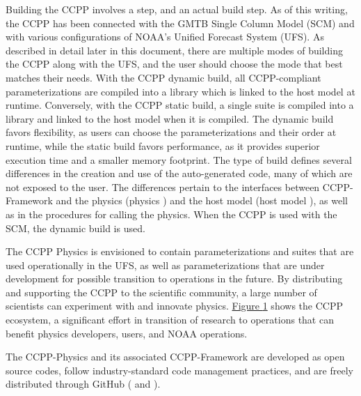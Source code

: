 \documentclass[letterpaper,10pt,english]{sphinxmanual}
\begin{document}
Building the CCPP involves a  step, and an actual build step. As of this
writing, the CCPP has been connected with the GMTB Single Column Model (SCM)
and with various configurations of NOAA’s Unified
Forecast System (UFS). As described in detail later in this document, there are
multiple modes of building the CCPP along with the UFS, and the user should choose the
mode that best matches their needs. With the CCPP dynamic build, all CCPP-compliant
parameterizations are compiled into a library which is linked to the host model at
runtime. Conversely, with the CCPP static build, a single suite is compiled into a
library and linked to the host model when it is compiled. The dynamic build favors
flexibility, as users can choose the parameterizations and their order at runtime,
while the static build favors performance, as it provides superior execution time and
a smaller memory footprint. The type of build defines several differences in the
creation and use of the auto-generated code, many of which are not exposed to the user.
The differences pertain to  the interfaces between CCPP-Framework and the physics
(physics ) and the host model (host model ), as well as in the procedures
for calling the physics. When the CCPP is used with the SCM, the dynamic build is used.

The CCPP Physics is envisioned to contain parameterizations and suites that are used
operationally in the UFS, as well as parameterizations that are under development
for possible transition to operations in the future. By distributing and supporting
the CCPP to the scientific community, a large number of scientists can experiment
with and innovate physics.  \hyperref[\detokenize{Overview:ccpp-ecosystem}]{Figure \ref{\detokenize{Overview:ccpp-ecosystem}}} shows the CCPP ecosystem,
a significant effort in transition of research to operations that can benefit physics
developers, users, and NOAA operations.

The CCPP-Physics and its associated CCPP-Framework are developed as open source codes,
follow industry-standard code management practices, and are freely distributed through
GitHub ( and ).

\begin{figure}[htbp]
\centering
\capstart

\noindent{}
\caption{}\label{\detokenize{Overview:id2}}\label{\detokenize{Overview:ccpp-ecosystem}}\end{figure}
\end{document}
